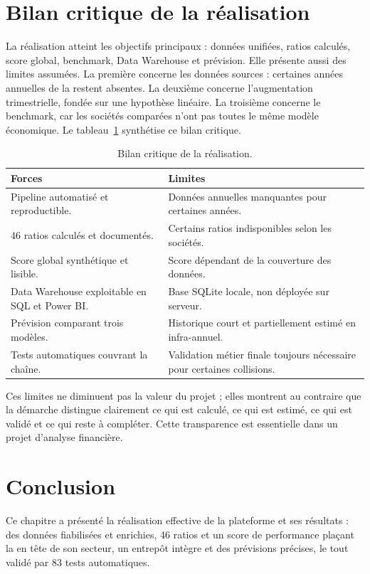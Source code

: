 \section{Bilan critique de la réalisation}
\label{sec:bilan_critique_realisation}
\par La réalisation atteint les objectifs principaux : données unifiées, ratios
calculés, score global, benchmark, Data Warehouse et prévision. Elle présente
aussi des limites assumées. La première concerne les données sources : certaines
années annuelles de la \sfbt restent absentes. La deuxième concerne
l'augmentation trimestrielle, fondée sur une hypothèse linéaire. La troisième
concerne le benchmark, car les sociétés comparées n'ont pas toutes le même modèle
économique. Le tableau~\ref{tab:bilan_critique} synthétise ce bilan critique.

\begin{table}[H]
\centering
\caption[Forces et limites de la réalisation]{Bilan critique de la réalisation.}
\label{tab:bilan_critique}
\begin{tabularx}{\linewidth}{|X|X|}
\hline
\textbf{Forces} & \textbf{Limites} \\ \hline
Pipeline automatisé et reproductible. & Données annuelles manquantes pour certaines années. \\ \hline
46 ratios calculés et documentés. & Certains ratios indisponibles selon les sociétés. \\ \hline
Score global synthétique et lisible. & Score dépendant de la couverture des données. \\ \hline
Data Warehouse exploitable en SQL et Power BI. & Base SQLite locale, non déployée sur serveur. \\ \hline
Prévision comparant trois modèles. & Historique court et partiellement estimé en infra-annuel. \\ \hline
Tests automatiques couvrant la chaîne. & Validation métier finale toujours nécessaire pour certaines collisions. \\ \hline
\end{tabularx}
\end{table}

\par Ces limites ne diminuent pas la valeur du projet ; elles montrent au
contraire que la démarche distingue clairement ce qui est calculé, ce qui est
estimé, ce qui est validé et ce qui reste à compléter. Cette transparence est
essentielle dans un projet d'analyse financière.

\section*{Conclusion}
\par Ce chapitre a présenté la réalisation effective de la plateforme et ses
résultats : des données fiabilisées et enrichies, 46 ratios et un score de
performance plaçant la \sfbt en tête de son secteur, un entrepôt intègre et des
prévisions précises, le tout validé par 83 tests automatiques.
